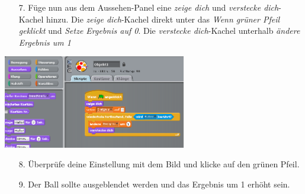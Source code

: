 \begin{itemize}
\item[7.] Füge nun aus dem Aussehen-Panel eine \textit{zeige dich} und \textit{verstecke dich}-Kachel hinzu.
\subitem Die \textit{zeige dich}-Kachel direkt unter das \textit{Wenn grüner Pfeil geklickt} und \textit{Setze Ergebnis auf 0}.
\subitem Die \textit{verstecke dich}-Kachel unterhalb \textit{ändere Ergebnis um 1}
\end{itemize}
\includegraphics[width=0.6\textwidth]{images/aufgabe3_ball2b.png}
\begin{itemize}
\item[8.] Überprüfe deine Einstellung mit dem Bild und klicke auf den grünen Pfeil.
\item[9.] Der Ball sollte ausgeblendet werden und das Ergebnis um 1 erhöht sein.
\end{itemize}


